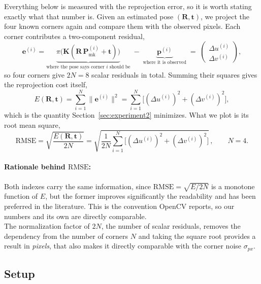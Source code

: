 \documentclass[11pt,a4paper]{article}
\theoremstyle{definition}
\theoremstyle{plain}
\theoremstyle{remark}
\newcommand{\Pmark}{\mathbf{P}_{\text{mk}}}
\newcommand{\KK}{\mathbf{K}}
\begin{document}
Everything below is measured with the reprojection error, so it is worth
stating exactly what that number is. Given an estimated pose
$(\mathbf{R},\mathbf{t})$, we project the four known corners again and compare
them with the observed pixels. Each corner contributes a two-component
residual,
\begin{equation}
  \mathbf{e}^{(i)}
  = \underbrace{\pi\!\big(\KK(\mathbf{R}\,\Pmark^{(i)} + \mathbf{t})\big)}
    _{\text{where the pose says corner } i \text{ should be}}
  \;-\;
  \underbrace{\mathbf{p}^{(i)}}_{\text{where it is observed}}
  \;=\;
  \begin{pmatrix} \Delta u^{(i)} \\ \Delta v^{(i)} \end{pmatrix},
  \label{eq:residual}
\end{equation}
so four corners give $2N = 8$ scalar residuals in total. Summing their squares
gives the reprojection cost itself,
\begin{equation}
  E(\mathbf{R},\mathbf{t}) = \sum_{i=1}^{N}\|\mathbf{e}^{(i)}\|^2
  = \sum_{i=1}^{N}\Big[(\Delta u^{(i)})^2+(\Delta v^{(i)})^2\Big],
  \label{eq:cost}
\end{equation}
which is the quantity Section~\ref{sec:experiment2} minimizes. What we plot is
its root mean square,
\begin{equation}
  \boxed{\quad
  \mathrm{RMSE}
  =\sqrt{\frac{E(\mathbf{R},\mathbf{t})}{2N}}
  =\sqrt{\frac{1}{2N}\sum_{i=1}^{N}
    \Big[(\Delta u^{(i)})^2+(\Delta v^{(i)})^2\Big]}\,,
  \qquad N = 4 .
  \quad}
  \label{eq:rmse}
\end{equation}

\paragraph{Rationale behind $\mathrm{RMSE}$:} Both indexes carry the same information, since
$\mathrm{RMSE}=\sqrt{E/2N}$ is a monotone function of $E$, but the former improves significantly the readability and has been preferred in the literature. This is the convention OpenCV reports, so our numbers and its own are directly comparable.\\
The normalization factor of $2N$, the number of scalar residuals, removes the dependency from the number of corners $N$ and taking the square root provides a result in \emph{pixels}, that also makes it directly comparable with the corner noise $\sigma_{px}$.

\subsection{Setup}
\end{document}
